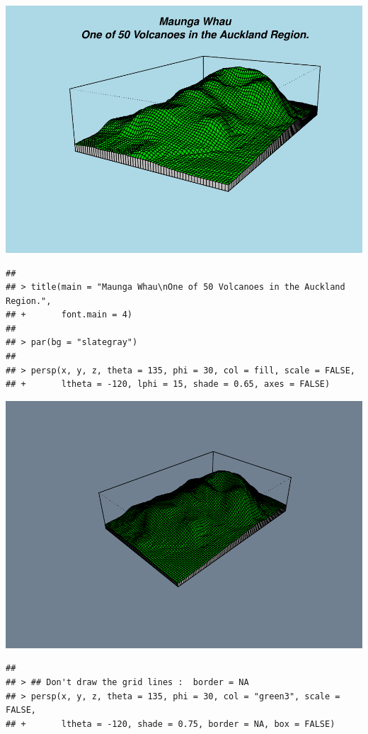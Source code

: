 \documentclass[
]{book}
\begin{document}
\includegraphics{TudodoR_files/figure-latex/unnamed-chunk-146-4.pdf}

\begin{verbatim}
## 
## > title(main = "Maunga Whau\nOne of 50 Volcanoes in the Auckland Region.",
## +       font.main = 4)
## 
## > par(bg = "slategray")
## 
## > persp(x, y, z, theta = 135, phi = 30, col = fill, scale = FALSE,
## +       ltheta = -120, lphi = 15, shade = 0.65, axes = FALSE)
\end{verbatim}

\includegraphics{TudodoR_files/figure-latex/unnamed-chunk-146-5.pdf}

\begin{verbatim}
## 
## > ## Don't draw the grid lines :  border = NA
## > persp(x, y, z, theta = 135, phi = 30, col = "green3", scale = FALSE,
## +       ltheta = -120, shade = 0.75, border = NA, box = FALSE)
\end{verbatim}
\end{document}
